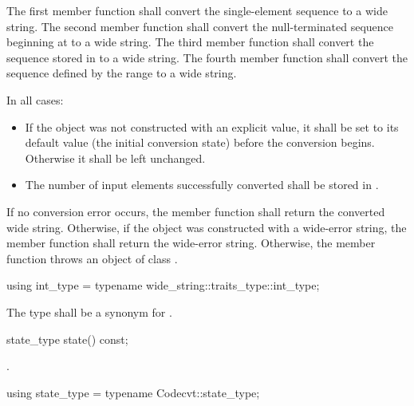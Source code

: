 \begin{itemdescr}
\pnum
\effects
The first member function shall convert the single-element sequence  to a
wide string. The second member function shall convert the null-terminated
sequence beginning at  to a wide string. The third member function
shall convert the sequence stored in  to a wide string. The fourth member
function shall convert the sequence defined by the range  to a
wide string.

\pnum
In all cases:

\begin{itemize}
\item If the  object was not constructed with an explicit value, it
shall be set to its default value (the initial conversion state) before the
conversion begins. Otherwise it shall be left unchanged.

\item The number of input elements successfully converted shall be stored in .
\end{itemize}

\pnum
\returns
If no conversion error occurs, the member function shall return the converted wide string.
Otherwise, if the object was constructed with a wide-error string, the
member function shall return the wide-error string.
Otherwise, the member function throws an object of class .
\end{itemdescr}

%
\begin{itemdecl}
using int_type = typename wide_string::traits_type::int_type;
\end{itemdecl}

\begin{itemdescr}
\pnum
The type shall be a synonym for .
\end{itemdescr}

%
\begin{itemdecl}
state_type state() const;
\end{itemdecl}

\begin{itemdescr}
\pnum
\returns
{}.
\end{itemdescr}

%
\begin{itemdecl}
using state_type = typename Codecvt::state_type;
\end{itemdecl}

